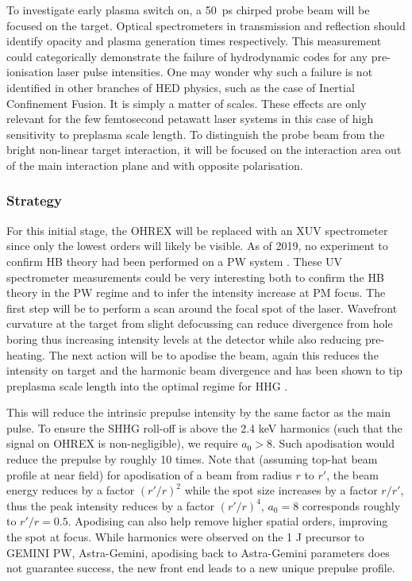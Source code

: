 To investigate early plasma switch on, a \qty{50}{ps} chirped probe beam will be focused on the target. Optical spectrometers in transmission and reflection should identify opacity and plasma generation times respectively. This measurement could categorically demonstrate the failure of hydrodynamic codes for any pre-ionisation laser pulse intensities. One may wonder why such a failure is not identified in other branches of HED physics, such as the case of Inertial Confinement Fusion. It is simply a matter of scales. These effects are only relevant for the few femtosecond petawatt laser systems in this case of high sensitivity to preplasma scale length.
To distinguish the probe beam from the bright non-linear target interaction, it will be focused on the interaction area out of the main interaction plane and with opposite polarisation.





\subsubsection{Strategy}
For this initial stage, the OHREX will be replaced with an XUV spectrometer since only the lowest orders will likely be visible. As of 2019, no experiment to confirm HB theory had been performed on a PW system \cite{vincentiAchievingExtremeLight2019}. These UV spectrometer measurements could be very interesting both to confirm the HB theory in the PW regime and to infer the intensity increase at PM focus. The first step will be to perform a scan around the focal spot of the laser. Wavefront curvature at the target from slight defocussing can reduce divergence from hole boring thus increasing intensity levels at the detector while also reducing pre-heating. The next action will be to apodise the beam, again this reduces the intensity on target and the harmonic beam divergence and has been shown to tip preplasma scale length into the optimal regime for HHG \cite{kahalyDirectObservationDensityGradient2013}.

This will reduce the intrinsic prepulse intensity by the same factor as the main pulse. To ensure the SHHG roll-off is above the 2.4 keV harmonics (such that the signal on OHREX is non-negligible), we require $a_0 > 8$. Such apodisation would reduce the prepulse by roughly 10 times. Note that (assuming top-hat beam profile at near field) for apodisation of a beam from radius $r$ to $r'$, the beam energy reduces by a factor $(r'/r)^2$ while the spot size increases by a factor $r/r'$, thus the peak intensity reduces by a factor $(r'/r)^4$, $a_0 =8$ corresponds roughly to $r'/r = 0.5$. Apodising can also help remove higher spatial orders, improving the spot at focus. While harmonics were observed on the 1 J precursor to GEMINI PW, Astra-Gemini, apodising back to Astra-Gemini parameters does not guarantee success, the new front end leads to a new unique prepulse profile.

